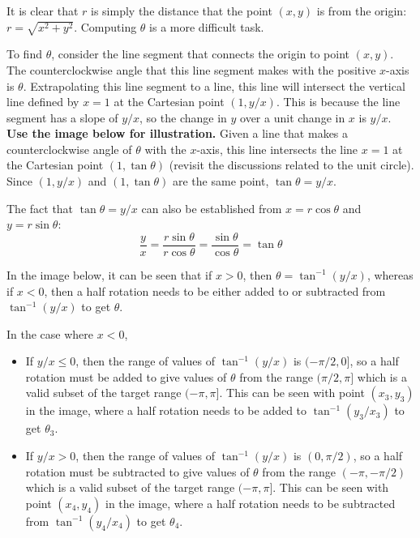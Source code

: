 \documentclass{article}
\begin{document}
It is clear that \(r\) is simply the distance that the point \((x,y)\) is from the origin: \(r = \sqrt{x^2 + y^2}\). Computing \(\theta\) is a more difficult task. 

To find \(\theta\), consider the line segment that connects the origin to point \((x, y)\). The counterclockwise angle that this line segment makes with the positive \(x\)-axis is \(\theta\). Extrapolating this line segment to a line, this line will intersect the vertical line defined by \(x = 1\) at the Cartesian point \((1, y/x)\). This is because the line segment has a slope of \(y/x\), so the change in \(y\) over a unit change in \(x\) is \(y/x\). {\bf Use the image below for illustration.} Given a line that makes a counterclockwise angle of \(\theta\) with the \(x\)-axis, this line intersects the line \(x = 1\) at the Cartesian point \((1, \tan\theta)\) (revisit the discussions related to the unit circle). Since \((1, y/x)\) and \((1, \tan\theta)\) are the same point, \(\tan\theta = y/x\). 

The fact that \(\tan\theta = y/x\) can also be established from \(x = r\cos\theta\) and \(y = r\sin\theta\):
\[\frac{y}{x} = \frac{r\sin\theta}{r\cos\theta} = \frac{\sin\theta}{\cos\theta} = \tan\theta\]

In the image below, it can be seen that if \(x > 0\), then \(\theta = \tan^{-1}(y/x)\), whereas if \(x < 0\), then a half rotation needs to be either added to or subtracted from \(\tan^{-1}(y/x)\) to get \(\theta\). 

In the case where \(x < 0\), 
\begin{itemize}
\item If \(y/x \leq 0\), then the range of values of \(\tan^{-1}(y/x)\) is \((-\pi/2, 0]\), so a half rotation must be added to give values of \(\theta\) from the range \((\pi/2, \pi]\) which is a valid subset of the target range \((-\pi, \pi]\). This can be seen with point \((x_3, y_3)\) in the image, where a half rotation needs to be added to \(\tan^{-1}(y_3/x_3)\) to get \(\theta_3\).
\item If \(y/x > 0\), then the range of values of \(\tan^{-1}(y/x)\) is \((0, \pi/2)\), so a half rotation must be subtracted to give values of \(\theta\) from the range \((-\pi, -\pi/2)\) which is a valid subset of the target range \((-\pi, \pi]\). This can be seen with point \((x_4, y_4)\) in the image, where a half rotation needs to be subtracted from \(\tan^{-1}(y_4/x_4)\) to get \(\theta_4\).
\end{itemize}
\end{document}
